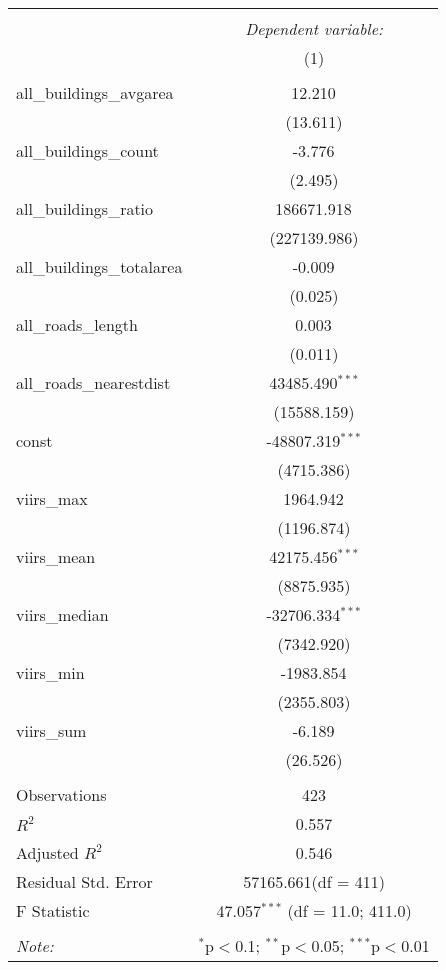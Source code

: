 \begin{table}[!htbp] \centering
\begin{tabular}{@{\extracolsep{5pt}}lc}
\\[-1.8ex]\hline
\hline \\[-1.8ex]
& \multicolumn{1}{c}{\textit{Dependent variable:}} \
\cr \cline{1-2}
\\[-1.8ex] & (1) \\
\hline \\[-1.8ex]
 all_buildings_avgarea & 12.210$^{}$ \\
  & (13.611) \\
 all_buildings_count & -3.776$^{}$ \\
  & (2.495) \\
 all_buildings_ratio & 186671.918$^{}$ \\
  & (227139.986) \\
 all_buildings_totalarea & -0.009$^{}$ \\
  & (0.025) \\
 all_roads_length & 0.003$^{}$ \\
  & (0.011) \\
 all_roads_nearestdist & 43485.490$^{***}$ \\
  & (15588.159) \\
 const & -48807.319$^{***}$ \\
  & (4715.386) \\
 viirs_max & 1964.942$^{}$ \\
  & (1196.874) \\
 viirs_mean & 42175.456$^{***}$ \\
  & (8875.935) \\
 viirs_median & -32706.334$^{***}$ \\
  & (7342.920) \\
 viirs_min & -1983.854$^{}$ \\
  & (2355.803) \\
 viirs_sum & -6.189$^{}$ \\
  & (26.526) \\
\hline \\[-1.8ex]
 Observations & 423 \\
 $R^2$ & 0.557 \\
 Adjusted $R^2$ & 0.546 \\
 Residual Std. Error & 57165.661(df = 411)  \\
 F Statistic & 47.057$^{***}$ (df = 11.0; 411.0) \\
\hline
\hline \\[-1.8ex]
\textit{Note:} & \multicolumn{1}{r}{$^{*}$p$<$0.1; $^{**}$p$<$0.05; $^{***}$p$<$0.01} \\
\end{tabular}
\end{table}